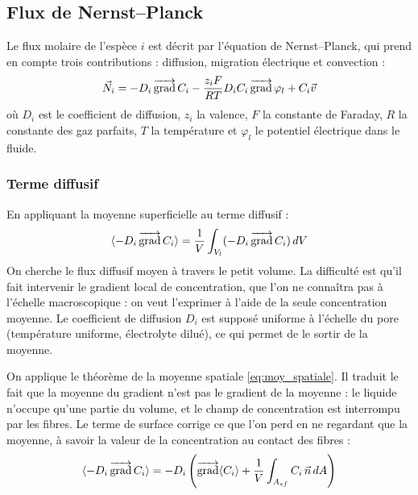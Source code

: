 
\subsection*{Flux de Nernst--Planck}


Le flux molaire de l'espèce $i$ est décrit par l'équation de Nernst--Planck,
qui prend en compte trois contributions : diffusion, migration électrique et convection :
\begin{equation}
\vec{N}_i = -D_i \mathop{\overrightarrow{\operatorname{grad}}}\nolimits C_i - \frac{z_i F}{RT} D_i C_i \mathop{\overrightarrow{\operatorname{grad}}}\nolimits \varphi_l + C_i \vec{v}
\label{eq:NP3D}
\end{equation}
où $D_i$ est le coefficient de diffusion, $z_i$ la valence, $F$ la constante
de Faraday, $R$ la constante des gaz parfaits, $T$ la température et
$\varphi_l$ le potentiel électrique dans le fluide.

\bigskip

\subsubsection*{Terme diffusif}

En appliquant la moyenne superficielle au terme diffusif :
\begin{equation}
\langle -D_i \mathop{\overrightarrow{\operatorname{grad}}}\nolimits C_i \rangle= \frac{1}{V}\int_{V_l} (-D_i \mathop{\overrightarrow{\operatorname{grad}}}\nolimits C_i)\, dV \notag
\end{equation}
On cherche le flux diffusif moyen à travers le petit volume. La difficulté est
qu'il fait intervenir le gradient local de concentration, que l'on ne connaîtra
pas à l'échelle macroscopique : on veut l'exprimer à l'aide de la seule
concentration moyenne. Le coefficient de diffusion $D_i$ est supposé uniforme à
l'échelle du pore (température uniforme, électrolyte dilué), ce qui permet de
le sortir de la moyenne.

On applique le théorème de la moyenne spatiale \eqref{eq:moy_spatiale}. Il
traduit le fait que la moyenne du gradient n'est pas le gradient de la
moyenne : le liquide n'occupe qu'une partie du volume, et le champ de
concentration est interrompu par les fibres. Le terme de surface corrige ce
que l'on perd en ne regardant que la moyenne, à savoir la valeur de la
concentration au contact des fibres :
\begin{equation}
\langle -D_i \mathop{\overrightarrow{\operatorname{grad}}}\nolimits C_i \rangle= -D_i \left(\mathop{\overrightarrow{\operatorname{grad}}}\nolimits\langle C_i \rangle + \frac{1}{V}\int_{A_{sf}} C_i\,\vec{n}\, dA \right) \notag
\end{equation}

